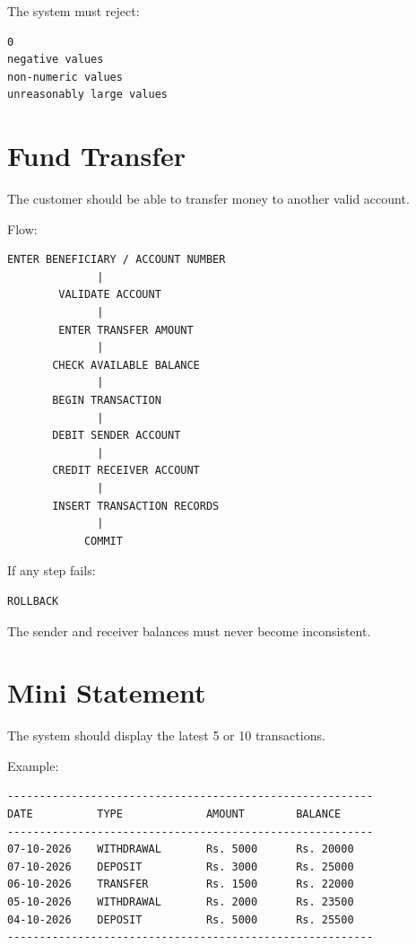 \documentclass[12pt,a4paper]{article}
\begin{document}
The system must reject:

\begin{verbatim}
0
negative values
non-numeric values
unreasonably large values
\end{verbatim}


\section{Fund Transfer}

The customer should be able to transfer money to another valid account.

Flow:

\begin{verbatim}
ENTER BENEFICIARY / ACCOUNT NUMBER
              |
        VALIDATE ACCOUNT
              |
        ENTER TRANSFER AMOUNT
              |
       CHECK AVAILABLE BALANCE
              |
       BEGIN TRANSACTION
              |
       DEBIT SENDER ACCOUNT
              |
       CREDIT RECEIVER ACCOUNT
              |
       INSERT TRANSACTION RECORDS
              |
            COMMIT
\end{verbatim}

If any step fails:

\begin{verbatim}
ROLLBACK
\end{verbatim}

The sender and receiver balances must never become inconsistent.


\section{Mini Statement}

The system should display the latest 5 or 10 transactions.

Example:

\begin{verbatim}
---------------------------------------------------------
DATE          TYPE             AMOUNT        BALANCE
---------------------------------------------------------
07-10-2026    WITHDRAWAL       Rs. 5000      Rs. 20000
07-10-2026    DEPOSIT          Rs. 3000      Rs. 25000
06-10-2026    TRANSFER         Rs. 1500      Rs. 22000
05-10-2026    WITHDRAWAL       Rs. 2000      Rs. 23500
04-10-2026    DEPOSIT          Rs. 5000      Rs. 25500
---------------------------------------------------------
\end{verbatim}
\end{document}
